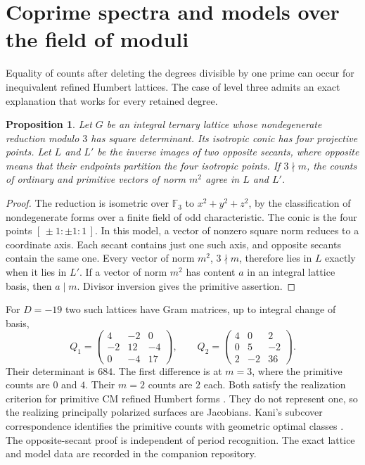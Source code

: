 \documentclass[11pt,letterpaper]{amsart}
\newtheorem{proposition}[theorem]{Proposition}
\theoremstyle{definition}
\numberwithin{equation}{section}
\begin{document}
\section{Coprime spectra and models over the field of moduli}
\label{sec:twins}

Equality of counts after deleting the degrees divisible by one prime
can occur for inequivalent refined Humbert lattices. The case of level
three admits an exact explanation that works for every retained degree.

\begin{proposition}\label{prop:secant}
Let \(G\) be an integral ternary lattice whose nondegenerate reduction
modulo \(3\) has square determinant. Its isotropic conic has four
projective points. Let \(L\) and \(L'\) be the inverse images of two
opposite secants, where opposite means that their endpoints partition
the four isotropic points. If \(3\nmid m\), the counts of ordinary and
primitive vectors of norm \(m^2\) agree in \(L\) and \(L'\).
\end{proposition}

\begin{proof}
The reduction is isometric over \(\mathbb F_3\) to
\(x^2+y^2+z^2\), by the classification of nondegenerate forms over
a finite field of odd characteristic. The conic is the four points
\([\,\pm1:\pm1:1\,]\). In this model, a vector of nonzero square norm
reduces to a coordinate axis. Each secant contains just one such
axis, and opposite secants contain the same one. Every vector of
norm \(m^2\), \(3\nmid m\), therefore lies in \(L\) exactly when it
lies in \(L'\). If a vector of norm \(m^2\) has content \(a\) in an
integral lattice basis, then \(a\mid m\). Divisor inversion gives the
primitive assertion.
\end{proof}

For \(D=-19\) two such lattices have Gram matrices, up to integral change
of basis,
\[
 Q_1=\begin{pmatrix}4&-2&0\\-2&12&-4\\0&-4&17\end{pmatrix},
 \qquad
 Q_2=\begin{pmatrix}4&0&2\\0&5&-2\\2&-2&36\end{pmatrix}.
\]
Their determinant is \(684\). The first difference is at \(m=3\),
where the primitive counts are \(0\) and \(4\). Their \(m=2\) counts
are \(2\) each. Both satisfy the realization criterion for primitive CM
refined Humbert forms \cite[Theorem 1]{KaniCM}. They do not represent one, so
the realizing principally polarized surfaces are Jacobians. Kani's
subcover correspondence identifies the primitive counts with geometric
optimal classes \cite{KaniI}. The opposite-secant proof is independent
of period recognition. The exact lattice and model data are recorded in the companion repository.
\end{document}

